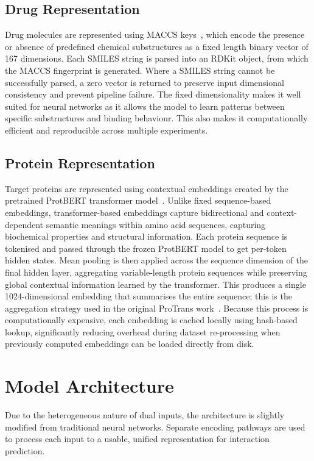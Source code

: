 \subsection{Drug Representation}
Drug molecules are represented using MACCS keys~\citep{durant2002reoptimization}, which encode the presence or absence of predefined chemical substructures as a fixed length binary vector of 167 dimensions.
Each SMILES string is parsed into an RDKit object, from which the MACCS fingerprint is generated.
Where a SMILES string cannot be successfully parsed, a zero vector is returned to preserve input dimensional consistency and prevent pipeline failure.
The fixed dimensionality makes it well suited for neural networks as it allows the model to learn patterns between specific substructures and binding behaviour.
This also makes it computationally efficient and reproducible across multiple experiments.
\subsection{Protein Representation}
Target proteins are represented using contextual embeddings created by the pretrained ProtBERT transformer model~\citep{Elnaggar2020.07.12.199554}.
Unlike fixed sequence-based embeddings, transformer-based embeddings capture bidirectional and context-dependent semantic meanings within amino acid sequences, capturing biochemical properties and structural information.
Each protein sequence is tokenised and passed through the frozen ProtBERT model to get per-token hidden states.
Mean pooling is then applied across the sequence dimension of the final hidden layer, aggregating variable-length protein sequences while preserving global contextual information learned by the transformer.
This produces a single 1024-dimensional embedding that summarises the entire sequence; this is the aggregation strategy used in the original ProTrans work~\citep{Elnaggar2020.07.12.199554}.
Because this process is computationally expensive, each embedding is cached locally using hash-based lookup, significantly reducing overhead during dataset re-processing when previously computed embeddings can be loaded directly from disk.

\section{Model Architecture}
Due to the heterogeneous nature of dual inputs, the architecture is slightly modified from traditional neural networks.
Separate encoding pathways are used to process each input to a usable, unified representation for interaction prediction.

